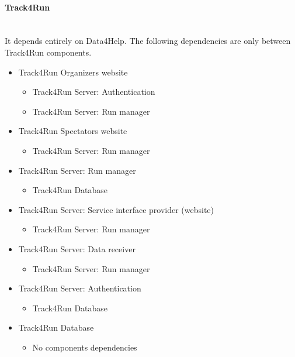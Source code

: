 \documentclass[../DD.tex]{subfiles}
\begin{document}
		\paragraph{Track4Run}\mbox{}\\
		It depends entirely on Data4Help. The following dependencies are only between Track4Run components.
		\begin{itemize}
			\item{Track4Run Organizers website}
			\begin{itemize}\item{Track4Run Server: Authentication}\item{Track4Run Server: Run manager}\end{itemize}
			\item{Track4Run Spectators website}
			\begin{itemize}\item{Track4Run Server: Run manager}\end{itemize}
			\item{Track4Run Server: Run manager}
			\begin{itemize}\item{Track4Run Database}\end{itemize}
			\item{Track4Run Server: Service interface provider (website)}
			\begin{itemize}\item{Track4Run Server: Run manager}\end{itemize}
			\item{Track4Run Server: Data receiver}
			\begin{itemize}\item{Track4Run Server: Run manager}\end{itemize}
			\item{Track4Run Server: Authentication}
			\begin{itemize}\item{Track4Run Database}\end{itemize}
			\item{Track4Run Database}
			\begin{itemize}\item{No components dependencies}\end{itemize}
		\end{itemize}
\end{document}
